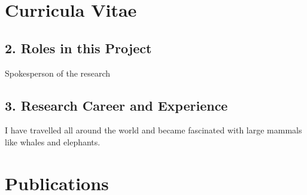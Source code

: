 
\section{Curricula Vitae}

\renewcommand{\Name}{Hideki YUKAWA}
\renewcommand{\DateOfBirth}{Feb. 29, 1900}
\renewcommand{\Age}{139}
\renewcommand{\AffiliationPosition}{\small{Ausaka University, Shell Lab., Professor Emeritus}}
\renewcommand{\Degree}{Ph.~D}

\vspace*{-8mm}
\subsection*{2. Roles in this Project}
	Spokesperson of the research

\subsection*{3. Research Career and Experience}
	I have travelled all around the world and 
	became fascinated with large mammals like whales and elephants.




\section{Publications}


